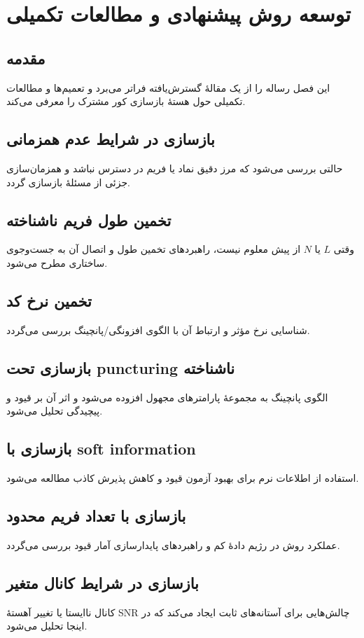 \chapter{توسعه روش پیشنهادی و مطالعات تکمیلی}
\label{chap:extensions}

\section{مقدمه}
این فصل رساله را از یک مقالهٔ گسترش‌یافته فراتر می‌برد و تعمیم‌ها و مطالعات تکمیلی حول هستهٔ بازسازی کور مشترک را معرفی می‌کند.

\section{بازسازی در شرایط عدم همزمانی}
حالتی بررسی می‌شود که مرز دقیق نماد یا فریم در دسترس نباشد و همزمان‌سازی جزئی از مسئلهٔ بازسازی گردد.

\section{تخمین طول فریم ناشناخته}
وقتی \(L\) یا \(N\) از پیش معلوم نیست، راهبردهای تخمین طول و اتصال آن به جست‌وجوی ساختاری مطرح می‌شود.

\section{تخمین نرخ کد}
شناسایی نرخ مؤثر و ارتباط آن با الگوی افزونگی/پانچینگ بررسی می‌گردد.

\section{بازسازی تحت puncturing ناشناخته}
الگوی پانچینگ به مجموعهٔ پارامترهای مجهول افزوده می‌شود و اثر آن بر قیود و پیچیدگی تحلیل می‌شود.

\section{بازسازی با soft information}
استفاده از اطلاعات نرم برای بهبود آزمون قیود و کاهش پذیرش کاذب مطالعه می‌شود.

\section{بازسازی با تعداد فریم محدود}
عملکرد روش در رژیم دادهٔ کم و راهبردهای پایدارسازی آمار قیود بررسی می‌گردد.

\section{بازسازی در شرایط کانال متغیر}
کانال ناایستا یا تغییر آهستهٔ SNR چالش‌هایی برای آستانه‌های ثابت ایجاد می‌کند که در اینجا تحلیل می‌شود.

